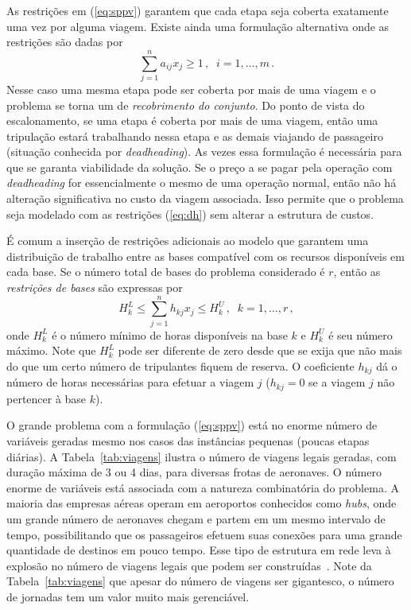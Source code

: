 \documentclass[12pt,a4paper]{article}
\newcommand{\ev}{\, ,}                                       %
\newcommand{\ep}{\, .}                                       %
\begin{document}
As restrições em (\ref{eq:sppv}) garantem que cada etapa seja coberta exatamente uma vez por alguma
viagem. Existe ainda uma formulação alternativa onde as restrições são dadas por
%
\begin{equation} \label{eq:dh}
	\sum_{j=1}^n a_{ij} x_j \geq 1 \, , \;\; i = 1, \ldots, m \ep
\end{equation}
%
Nesse caso uma mesma etapa pode ser coberta por mais de uma viagem e o problema se torna um de
\emph{recobrimento do conjunto}. Do ponto de vista do escalonamento, se uma etapa é coberta por mais
de uma viagem, então uma tripulação estará trabalhando nessa etapa e as demais viajando de
passageiro (situação conhecida por \emph{deadheading}). As vezes essa formulação é necessária para
que se garanta viabilidade da solução. Se o preço a se pagar pela operação com \emph{deadheading} 
for essencialmente o mesmo de uma operação normal, então não há alteração significativa no custo 
da viagem associada. Isso permite que o problema seja modelado com as restrições (\ref{eq:dh}) 
sem alterar a estrutura de custos.

É comum a inserção de restrições adicionais ao modelo que garantem uma distribuição de trabalho
entre as bases compatível com os recursos disponíveis em cada base. Se o número total de bases do
problema considerado é $r$, então as \emph{restrições de bases} são expressas por
%
\begin{equation} \label{eq:bases}
	H_k^L \leq \sum_{j=1}^n h_{kj} x_j \leq H_k^U \, , \;\; k = 1, \ldots, r \ev
\end{equation} 
%
onde $H_k^L$ é o número mínimo de horas disponíveis na base $k$ e $H_k^U$ é seu número máximo. 
Note que $H_k^L$ pode ser diferente de zero desde que se exija que não mais do que um certo número 
de tripulantes fiquem de reserva. O coeficiente $h_{kj}$ dá o número de horas necessárias para 
efetuar a viagem $j$ ($h_{kj} = 0$ se a viagem $j$ não pertencer à base $k$).

O grande problema com a formulação (\ref{eq:sppv}) está no enorme número de variáveis geradas mesmo
nos casos das instâncias pequenas (poucas etapas diárias). A Tabela~\ref{tab:viagens} ilustra o
número de viagens legais geradas, com duração máxima de 3 ou 4 dias, para diversas frotas de
aeronaves. O número enorme de variáveis está associada com a natureza combinatória do problema. A
maioria das empresas aéreas operam em aeroportos conhecidos como \emph{hubs}, onde um grande número
de aeronaves chegam e partem em um mesmo intervalo de tempo, possibilitando que os passageiros
efetuem suas conexões para uma grande quantidade de destinos em pouco tempo. Esse tipo de estrutura
em rede leva à explosão no número de viagens legais que podem ser construídas~\cite{graves93}.
Note da Tabela~\ref{tab:viagens} que apesar do número de viagens ser gigantesco, o número de 
jornadas tem um valor muito mais gerenciável.
\end{document}
